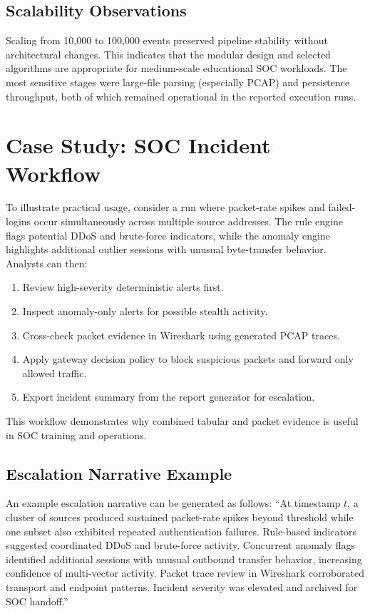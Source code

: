\documentclass[conference]{IEEEtran}
\begin{document}
\subsection{Scalability Observations}
Scaling from 10,000 to 100,000 events preserved pipeline stability without architectural changes. This indicates that the modular design and selected algorithms are appropriate for medium-scale educational SOC workloads. The most sensitive stages were large-file parsing (especially PCAP) and persistence throughput, both of which remained operational in the reported execution runs.

\section{Case Study: SOC Incident Workflow}
To illustrate practical usage, consider a run where packet-rate spikes and failed-logins occur simultaneously across multiple source addresses. The rule engine flags potential DDoS and brute-force indicators, while the anomaly engine highlights additional outlier sessions with unusual byte-transfer behavior. Analysts can then:
\begin{enumerate}
    \item Review high-severity deterministic alerts first.
    \item Inspect anomaly-only alerts for possible stealth activity.
    \item Cross-check packet evidence in Wireshark using generated PCAP traces.
    \item Apply gateway decision policy to block suspicious packets and forward only allowed traffic.
    \item Export incident summary from the report generator for escalation.
\end{enumerate}

This workflow demonstrates why combined tabular and packet evidence is useful in SOC training and operations.

\subsection{Escalation Narrative Example}
An example escalation narrative can be generated as follows: ``At timestamp $t$, a cluster of sources produced sustained packet-rate spikes beyond threshold while one subset also exhibited repeated authentication failures. Rule-based indicators suggested coordinated DDoS and brute-force activity. Concurrent anomaly flags identified additional sessions with unusual outbound transfer behavior, increasing confidence of multi-vector activity. Packet trace review in Wireshark corroborated transport and endpoint patterns. Incident severity was elevated and archived for SOC handoff.''
\end{document}
